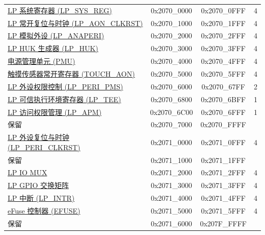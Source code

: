 \begin{ThreePartTable}
\begin{longtable}[c]{ |p{7cm}|c|c|r| }
        \rowcolor{lightgray}\multicolumn{4}{|l|}{\textbf{LP 外设}}\\\hline
    \hyperref[mod:sysreg]{LP 系统寄存器 (LP\_SYS\_REG)} & 0x2070\_0000 & 0x2070\_0FFF &   4\\\hline
    \hyperref[mod:resclk]{LP 常开复位与时钟 (LP\_AON\_CLKRST)} & 0x2070\_1000 & 0x2070\_1FFF &   4\\\hline
    \hyperref[mod:lowpowm]{LP 模拟外设 (LP\_ANAPERI)} & 0x2070\_2000 & 0x2070\_2FFF &   4\\\hline
    \hyperref[mod:keymng]{LP HUK 生成器 (LP\_HUK)} & 0x2070\_3000 & 0x2070\_3FFF &   4\\\hline
    \hyperref[mod:lowpowm]{电源管理单元 (PMU)} & 0x2070\_4000 & 0x2070\_4FFF &   4\\\hline
    \hyperref[mod:tchsen]{触摸传感器常开寄存器 (TOUCH\_AON)} & 0x2070\_5000 & 0x2070\_5FFF &   4\\\hline
    \hyperref[mod:permctrl]{LP 外设权限控制 (LP\_PERI\_PMS)} & 0x2070\_6000 & 0x2070\_67FF &   2\\\hline
    \hyperref[mod:permctrl]{LP 可信执行环境寄存器 (LP\_TEE)} & 0x2070\_6800 & 0x2070\_6BFF &   1\\\hline
    \hyperref[mod:permctrl]{LP 访问权限管理 (LP\_APM)} & 0x2070\_6C00 & 0x2070\_6FFF &   1\\\hline
        \rowcolor{gray!25}  保留          & 0x2070\_7000 & 0x2070\_FFFF &    \\\hline
    \hyperref[mod:resclk]{LP 外设复位与时钟 (LP\_PERI\_CLKRST)} & 0x2071\_0000 & 0x2071\_0FFF &   4\\\hline
        \rowcolor{gray!25}  保留          & 0x2071\_1000 & 0x2071\_1FFF &    \\\hline
    \hyperref[mod:iomuxgpio]{LP IO MUX} & 0x2071\_2000 & 0x2071\_2FFF &   4\\\hline
    \hyperref[mod:iomuxgpio]{LP GPIO 交换矩阵} & 0x2071\_3000 & 0x2071\_3FFF &   4\\\hline
    \hyperref[mod:ulp]{LP 中断 (LP\_INTR)} & 0x2071\_4000 & 0x2071\_4FFF &   4\\\hline
    \hyperref[mod:efuse]{eFuse 控制器 (EFUSE)} & 0x2071\_5000 & 0x2071\_5FFF &   4\\\hline
        \rowcolor{gray!25}  保留          & 0x2071\_6000 & 0x207F\_FFFF &    \\\hline


\end{longtable}
\end{ThreePartTable}
